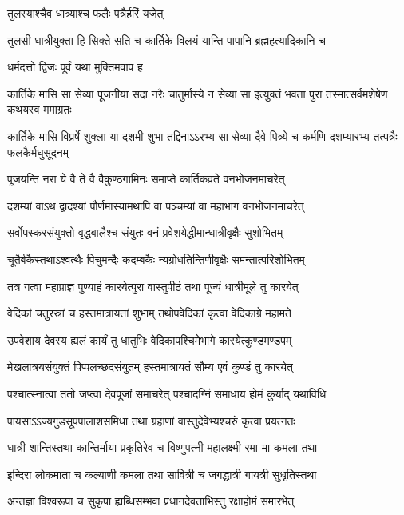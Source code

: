 \onelineshloka
{तुलस्याश्चैव धात्र्याश्च फलैः पत्रैर्हरिं यजेत्} %

\twolineshloka
{तुलसी धात्रीयुक्ता हि सिक्ते सति च कार्तिके}
{विलयं यान्ति पापानि ब्रह्महत्यादिकानि च} %


\onelineshloka
{धर्मदत्तो द्विजः पूर्वं यथा मुक्तिमवाप ह} %


\threelineshloka
{कार्तिके मासि सा सेव्या पूजनीया सदा नरैः}
{चातुर्मास्ये न सेव्या सा इत्युक्तं भवता पुरा}
{तस्मात्सर्वमशेषेण कथयस्व ममाग्रतः} %


\threelineshloka
{कार्तिके मासि विप्रर्षे शुक्ला या दशमी शुभा}
{तद्दिनाऽऽरभ्य सा सेव्या दैवे पित्र्ये च कर्मणि}
{दशम्यारभ्य तत्पत्रैः फलकैर्मधुसूदनम्} %

\twolineshloka
{पूजयन्ति नरा ये वै ते वै वैकुण्ठगामिनः}
{समाप्ते कार्तिकव्रते वनभोजनमाचरेत्} %

\twolineshloka
{दशम्यां वाऽथ द्वादश्यां पौर्णमास्यामथापि वा}
{पञ्चम्यां वा महाभाग वनभोजनमाचरेत्} %

\twolineshloka
{सर्वोपस्करसंयुक्तो वृद्धबालैश्च संयुतः}
{वनं प्रवेशयेद्धीमान्धात्रीवृक्षैः सुशोभितम्} %

\twolineshloka
{चूतैर्बकैस्तथाऽश्वत्थैः पिचुमन्दैः कदम्बकैः}
{न्यग्रोधतिन्तिणीवृक्षैः समन्तात्परिशोभितम्} %

\twolineshloka
{तत्र गत्वा महाप्राज्ञ पुण्याहं कारयेत्पुरा}
{वास्तुपीठं तथा पूज्यं धात्रीमूले तु कारयेत्} %

\twolineshloka
{वेदिकां चतुरस्रां च हस्तमात्रायतां शुभाम्}
{तथोपवेदिकां कृत्वा वेदिकाग्रे महामते} %

\twolineshloka
{उपवेशाय देवस्य ह्यलं कार्यं तु धातुभिः}
{वेदिकापश्चिमेभागे कारयेत्कुण्डमण्डपम्} %

\twolineshloka
{मेखलात्रयसंयुक्तं पिप्पलच्छदसंयुतम्}
{हस्तमात्रायतं सौम्य एवं कुण्डं तु कारयेत्} %

\twolineshloka
{पश्चात्स्नात्वा ततो जप्त्वा देवपूजां समाचरेत्}
{पश्चादग्निं समाधाय होमं कुर्याद् यथाविधि} %

\twolineshloka
{पायसाऽऽज्यगुडसूपपालाशसमिधा तथा}
{ग्रहाणां वास्तुदेवेभ्यश्चरुं कृत्वा प्रयत्नतः} %

\twolineshloka
{धात्री शान्तिस्तथा कान्तिर्माया प्रकृतिरेव च}
{विष्णुपत्नी महालक्ष्मी रमा मा कमला तथा} %

\twolineshloka
{इन्दिरा लोकमाता च कल्याणी कमला तथा}
{सावित्री च जगद्धात्री गायत्री सुधृतिस्तथा} %

\twolineshloka
{अन्तज्ञा विश्वरूपा च सुकृपा ह्यब्धिसम्भवा}
{प्रधानदेवताभिस्तु रक्षाहोमं समारभेत्} %

